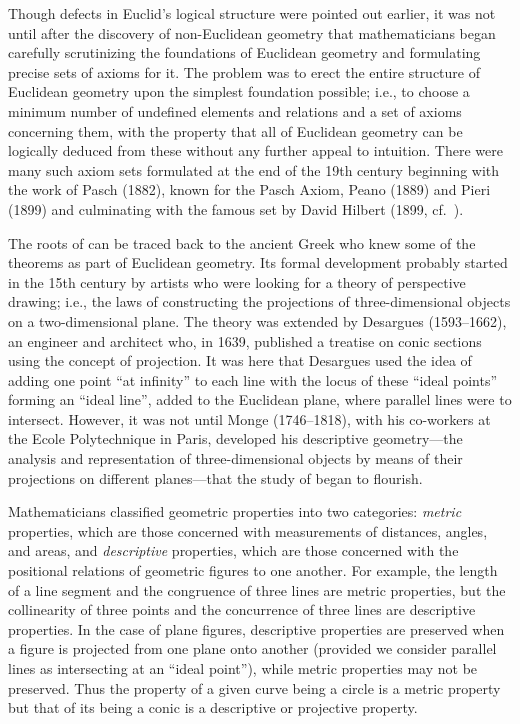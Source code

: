 Though defects in Euclid's logical structure were pointed out
earlier, it was not until after the discovery of non-Euclidean
geometry that mathematicians began carefully scrutinizing the
foundations of Euclidean geometry and formulating precise sets of
axioms for it. The problem was to erect the entire structure of
Euclidean geometry upon the simplest foundation possible; i.e., to
choose a minimum number of undefined elements and relations and a set
of axioms concerning them, with the property that all of Euclidean
geometry can be logically deduced from these without any further
appeal to intuition. There were many such axiom sets formulated at the
end of the 19th century beginning with the work of Pasch (1882), known
for the Pasch Axiom, Peano (1889) and Pieri (1899) and culminating
with the famous set by David Hilbert (1899, cf.~\cite{hilbert-geometrie}).

The roots of \pg can be traced back to the ancient Greek who knew some of
the theorems as part of Euclidean geometry. Its formal development
probably started in the 15th century by artists who were
looking for a theory of perspective drawing; i.e., the laws of
constructing the projections of three-dimensional  objects on a
two-dimensional plane. The theory was extended by Desargues
(1593--1662), an engineer and architect who, in 1639, published a
treatise on conic sections using the concept of projection. It was
here that Desargues used the idea of adding one point ``at infinity''
to each line with the locus of these ``ideal points'' forming an
``ideal line'', added to the Euclidean plane, where parallel lines
were to intersect. However, it was not until Monge (1746--1818), with
his co-workers at the Ecole Polytechnique in Paris, developed his
descriptive geometry---the analysis and representation of
three-dimensional objects by means of their projections on different
planes---that the study of \pg began to flourish.

Mathematicians classified geometric properties into two categories:
\emph{metric} properties, which are those concerned with measurements
of distances, angles, and areas, and \emph{descriptive} properties,
which are those concerned with the positional relations of geometric
figures to one another. For example, the length of a line segment and
the congruence of three lines are metric properties, but the
collinearity of three points and the concurrence of three lines are
descriptive properties. In the case of plane figures, descriptive
properties are preserved when a figure is projected from one plane
onto another (provided we consider parallel lines as intersecting at
an ``ideal point''), while metric properties may not be preserved.
Thus the property of a given curve being a circle is a metric property
but that of its being a conic is a descriptive or projective property.

